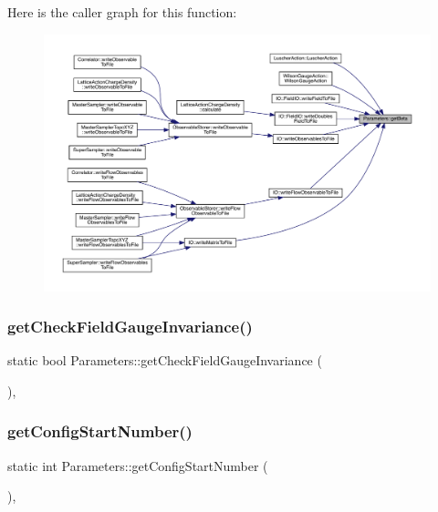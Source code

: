 Here is the caller graph for this function\+:
\nopagebreak
\begin{figure}[H]
\begin{center}
\leavevmode
\includegraphics[width=350pt]{class_parameters_ae5c64523dc50dca13b417fe3d9e4175c_icgraph}
\end{center}
\end{figure}
\mbox{\label{class_parameters_a2563b9474acd87cf4a350f488c71339f}} 
\subsubsection{\texorpdfstring{getCheckFieldGaugeInvariance()}{getCheckFieldGaugeInvariance()}}
{\footnotesize\ttfamily static bool Parameters\+::get\+Check\+Field\+Gauge\+Invariance (\begin{DoxyParamCaption}{ }\end{DoxyParamCaption})\hspace{0.3cm}{\ttfamily [inline]}, {\ttfamily [static]}}

\mbox{\label{class_parameters_a58f15668b37e705d34d6588e287e4bc0}} 
\subsubsection{\texorpdfstring{getConfigStartNumber()}{getConfigStartNumber()}}
{\footnotesize\ttfamily static int Parameters\+::get\+Config\+Start\+Number (\begin{DoxyParamCaption}{ }\end{DoxyParamCaption})\hspace{0.3cm}{\ttfamily [inline]}, {\ttfamily [static]}}

